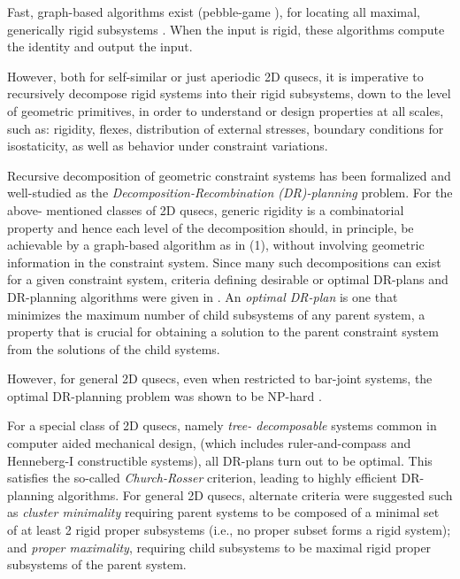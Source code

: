 Fast, graph-based algorithms exist (pebble-game \cite{Jacobs:1997:PG}), for
locating all maximal, generically rigid subsystems \cite{XX}. When the
input is rigid, these algorithms compute the identity and output the
input.

However, both for self-similar or just aperiodic 2D qusecs, it is
imperative to recursively decompose rigid systems into their rigid
subsystems, down to the level of geometric primitives, in order to
understand or design properties at all scales, such as: rigidity,
flexes, distribution of external stresses, boundary conditions for
isostaticity, as well as behavior under constraint variations.

Recursive decomposition of geometric constraint systems has been
formalized \cite{XX} and well-studied \cite{XX} as the {\sl
Decomposition-Recombination (DR)-planning} problem. For the above-
mentioned classes of 2D qusecs, generic rigidity is a combinatorial
property and hence each level of the decomposition should, in
principle, be achievable by a graph-based algorithm as in (1), without
involving geometric information in the constraint system. Since many
such decompositions can exist for a given constraint system, criteria
defining desirable or optimal DR-plans and DR-planning algorithms were
given in \cite{XX}. An \emph{optimal DR-plan} is one that minimizes
the maximum number of child subsystems of any parent system, a
property that is crucial for obtaining a solution to the parent
constraint system from the solutions of the child systems.

However, for general 2D qusecs, even when restricted to bar-joint
systems, the optimal DR-planning problem was shown to be NP-hard
\cite{XX}.

For a special class of 2D qusecs, namely \emph{tree- decomposable}
systems \cite{XX} common in computer aided mechanical design, (which
includes ruler-and-compass and Henneberg-I constructible systems), all
DR-plans turn out to be optimal. This satisfies the so-called \emph
{Church-Rosser} criterion, leading to highly efficient DR-planning
algorithms. For general 2D qusecs, alternate criteria were suggested
such as \emph{cluster minimality} requiring parent systems to be
composed of a minimal set of at least 2 rigid proper subsystems (i.e.,
no proper subset forms a rigid system); and \emph{proper maximality},
requiring child subsystems to be maximal rigid proper subsystems of
the parent system.

